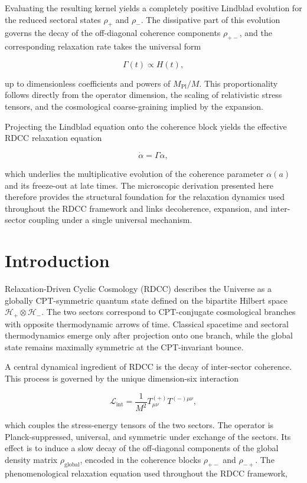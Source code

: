 \documentclass[11pt,a4paper]{article}
\newcommand{\Hglobal}{\mathcal{H}_+ \otimes \mathcal{H}_-}
\newcommand{\rglobal}{\rho_{\mathrm{global}}}
\newcommand{\rplus}{\rho_+}
\newcommand{\rminus}{\rho_-}
\newcommand{\rpm}{\rho_{+-}}
\newcommand{\rmp}{\rho_{-+}}
\newcommand{\LintDef}{\mathcal{L}_{\mathrm{int}} = \frac{1}{M^2} T^{(+)}_{\mu\nu} T^{(-)\mu\nu}}
\newcommand{\RelaxEq}{\dot{\alpha} = \Gamma \alpha}
\begin{document}
Evaluating the resulting kernel yields a completely positive Lindblad evolution
for the reduced sectoral states \(\rplus\) and \(\rminus\). The dissipative part of
this evolution governs the decay of the off-diagonal coherence components
\(\rpm\), and the corresponding relaxation rate takes the universal form


\[
\Gamma(t) \propto H(t),
\]


up to dimensionless coefficients and powers of \(M_{\mathrm{Pl}}/M\). This
proportionality follows directly from the operator dimension, the scaling of
relativistic stress tensors, and the cosmological coarse-graining implied by
the expansion.

Projecting the Lindblad equation onto the coherence block yields the effective
RDCC relaxation equation


\[
\RelaxEq,
\]


which underlies the multiplicative evolution of the coherence parameter
\(\alpha(a)\) and its freeze-out at late times. The microscopic derivation
presented here therefore provides the structural foundation for the relaxation
dynamics used throughout the RDCC framework and links decoherence, expansion,
and inter-sector coupling under a single universal mechanism.

\section{Introduction}

Relaxation-Driven Cyclic Cosmology (RDCC) describes the Universe as a globally
CPT-symmetric quantum state defined on the bipartite Hilbert space
\(\Hglobal\). The two sectors correspond to CPT-conjugate cosmological
branches with opposite thermodynamic arrows of time. Classical spacetime and
sectoral thermodynamics emerge only after projection onto one branch, while the
global state remains maximally symmetric at the CPT-invariant bounce.

A central dynamical ingredient of RDCC is the decay of inter-sector coherence.
This process is governed by the unique dimension-six interaction


\[
\LintDef,
\]


which couples the stress-energy tensors of the two sectors. The operator is
Planck-suppressed, universal, and symmetric under exchange of the sectors. Its
effect is to induce a slow decay of the off-diagonal components of the global
density matrix \(\rglobal\), encoded in the coherence blocks \(\rpm\) and
\(\rmp\). The phenomenological relaxation equation used throughout the RDCC
framework,
\end{document}
